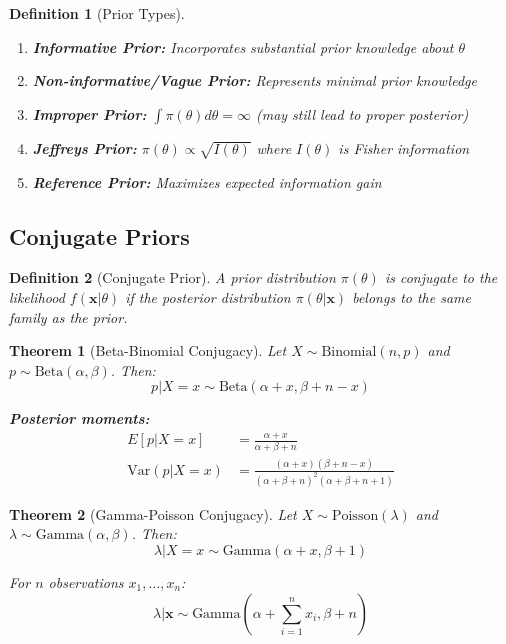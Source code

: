 \documentclass[12pt,a4paper]{article}
\newtheorem{theorem}{Theorem}[section]
\newtheorem{definition}{Definition}[section]
\theoremstyle{remark}
\begin{document}
\begin{definition}[Prior Types]
\begin{enumerate}
\item \textbf{Informative Prior:} Incorporates substantial prior knowledge about $\theta$
\item \textbf{Non-informative/Vague Prior:} Represents minimal prior knowledge
\item \textbf{Improper Prior:} $\int \pi(\theta) d\theta = \infty$ (may still lead to proper posterior)
\item \textbf{Jeffreys Prior:} $\pi(\theta) \propto \sqrt{I(\theta)}$ where $I(\theta)$ is Fisher information
\item \textbf{Reference Prior:} Maximizes expected information gain
\end{enumerate}
\end{definition}

\subsection{Conjugate Priors}

\begin{definition}[Conjugate Prior]
A prior distribution $\pi(\theta)$ is conjugate to the likelihood $f(\mathbf{x} | \theta)$ if the posterior distribution $\pi(\theta | \mathbf{x})$ belongs to the same family as the prior.
\end{definition}

\begin{theorem}[Beta-Binomial Conjugacy]
Let $X \sim \text{Binomial}(n, p)$ and $p \sim \text{Beta}(\alpha, \beta)$. Then:
$$p | X = x \sim \text{Beta}(\alpha + x, \beta + n - x)$$

\textbf{Posterior moments:}
\begin{align}
E[p | X = x] &= \frac{\alpha + x}{\alpha + \beta + n}\\
\text{Var}(p | X = x) &= \frac{(\alpha + x)(\beta + n - x)}{(\alpha + \beta + n)^2(\alpha + \beta + n + 1)}
\end{align}
\end{theorem}

\begin{theorem}[Gamma-Poisson Conjugacy]
Let $X \sim \text{Poisson}(\lambda)$ and $\lambda \sim \text{Gamma}(\alpha, \beta)$. Then:
$$\lambda | X = x \sim \text{Gamma}(\alpha + x, \beta + 1)$$

For $n$ observations $x_1, \ldots, x_n$:
$$\lambda | \mathbf{x} \sim \text{Gamma}\left(\alpha + \sum_{i=1}^n x_i, \beta + n\right)$$
\end{theorem}
\end{document}
